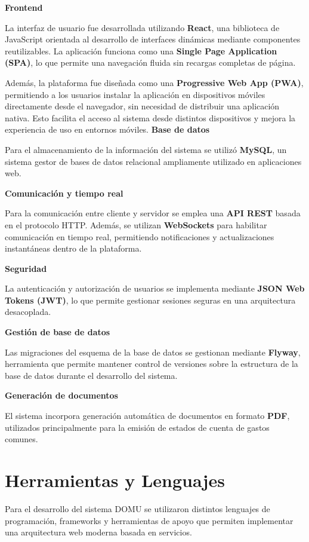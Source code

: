 \textbf{Frontend}

La interfaz de usuario fue desarrollada utilizando \textbf{React}, una biblioteca de JavaScript orientada al desarrollo de interfaces dinámicas mediante componentes reutilizables. 
La aplicación funciona como una \textbf{Single Page Application (SPA)}, lo que permite una navegación fluida sin recargas completas de página.

Además, la plataforma fue diseñada como una \textbf{Progressive Web App (PWA)}, permitiendo a los usuarios instalar la aplicación en dispositivos móviles directamente desde el navegador, sin necesidad de distribuir una aplicación nativa. Esto facilita el acceso al sistema desde distintos dispositivos y mejora la experiencia de uso en entornos móviles.
\textbf{Base de datos}

Para el almacenamiento de la información del sistema se utilizó \textbf{MySQL}, un sistema gestor de bases de datos relacional ampliamente utilizado en aplicaciones web.

\textbf{Comunicación y tiempo real}

Para la comunicación entre cliente y servidor se emplea una \textbf{API REST} basada en el protocolo HTTP. Además, se utilizan \textbf{WebSockets} para habilitar comunicación en tiempo real, permitiendo notificaciones y actualizaciones instantáneas dentro de la plataforma.

\textbf{Seguridad}

La autenticación y autorización de usuarios se implementa mediante \textbf{JSON Web Tokens (JWT)}, lo que permite gestionar sesiones seguras en una arquitectura desacoplada.

\textbf{Gestión de base de datos}

Las migraciones del esquema de la base de datos se gestionan mediante \textbf{Flyway}, herramienta que permite mantener control de versiones sobre la estructura de la base de datos durante el desarrollo del sistema.

\textbf{Generación de documentos}

El sistema incorpora generación automática de documentos en formato \textbf{PDF}, utilizados principalmente para la emisión de estados de cuenta de gastos comunes.

\section{Herramientas y Lenguajes}

Para el desarrollo del sistema DOMU se utilizaron distintos lenguajes de programación, frameworks y herramientas de apoyo que permiten implementar una arquitectura web moderna basada en servicios.

